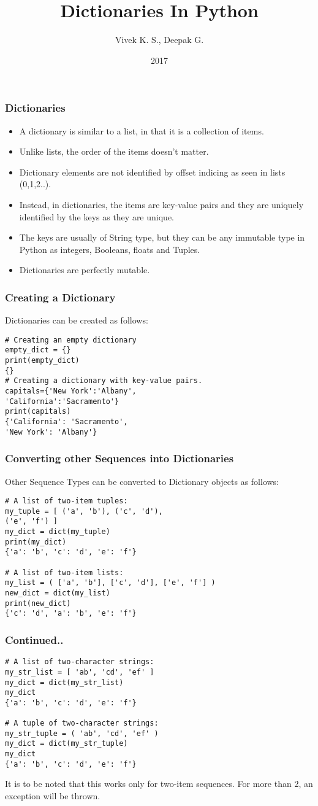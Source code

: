 \documentclass{beamer}
\title{Dictionaries In Python}
\author{Vivek K. S., Deepak G.}
\institute{Information Systems Decision Sciences (ISDS)\\
MUMA College of Business\\
University of South Florida \\
Tampa, Florida}
\date{2017}
\begin{document}
\frame{\titlepage}

\begin{frame}
\frametitle{Dictionaries}
\begin{itemize}
\item A dictionary is similar to a list, in that it is a collection of items.
\item Unlike lists, the order of the items doesn't matter.
\item Dictionary elements are not identified by offset indicing as seen in lists (0,1,2..).
\item Instead, in dictionaries, the items are key-value pairs and they are uniquely identified by the keys as they are unique. 
\item The keys are usually of String type, but they can be any immutable type in Python as integers, Booleans, floats and Tuples.
\item Dictionaries are perfectly mutable.
\end{itemize}
\end{frame}

\begin{frame}[fragile]
\frametitle{Creating a Dictionary}
Dictionaries can be created as follows:
\begin{lstlisting}
# Creating an empty dictionary
empty_dict = {}
print(empty_dict)
{}
# Creating a dictionary with key-value pairs.
capitals={'New York':'Albany',
'California':'Sacramento'}
print(capitals)
{'California': 'Sacramento', 
'New York': 'Albany'}
\end{lstlisting}
\end{frame}

\begin{frame}[fragile]
\frametitle{Converting other Sequences into Dictionaries}
Other Sequence Types can be converted to Dictionary objects as follows:
\begin{lstlisting}
# A list of two-item tuples:
my_tuple = [ ('a', 'b'), ('c', 'd'), 
('e', 'f') ]
my_dict = dict(my_tuple)
print(my_dict)
{'a': 'b', 'c': 'd', 'e': 'f'}

# A list of two-item lists:
my_list = ( ['a', 'b'], ['c', 'd'], ['e', 'f'] )
new_dict = dict(my_list)
print(new_dict)
{'c': 'd', 'a': 'b', 'e': 'f'}
\end{lstlisting}
\end{frame}

\begin{frame}[fragile]
\frametitle{Continued..}
\begin{lstlisting}
# A list of two-character strings:
my_str_list = [ 'ab', 'cd', 'ef' ]
my_dict = dict(my_str_list)
my_dict
{'a': 'b', 'c': 'd', 'e': 'f'}

# A tuple of two-character strings:
my_str_tuple = ( 'ab', 'cd', 'ef' )
my_dict = dict(my_str_tuple)
my_dict
{'a': 'b', 'c': 'd', 'e': 'f'}
\end{lstlisting}
It is to be noted that this works only for two-item sequences. For more than 2, an exception will be thrown.
\end{frame}
\end{document}
